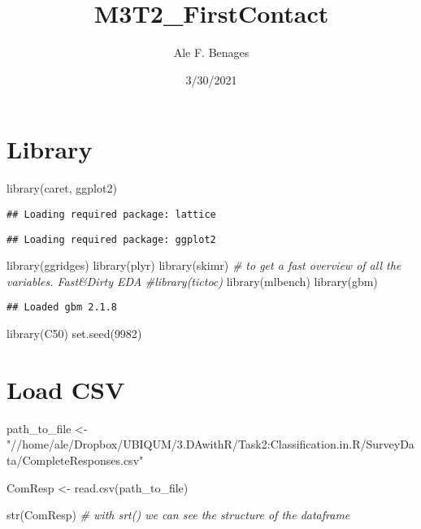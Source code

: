 \documentclass[
]{article}
\title{M3T2\_FirstContact}
\author{Ale F. Benages}
\date{3/30/2021}
\newenvironment{Shaded}{\begin{snugshade}}{\end{snugshade}}
\newcommand{\CommentTok}[1]{\textcolor[rgb]{0.56,0.35,0.01}{\textit{#1}}}
\newcommand{\DecValTok}[1]{\textcolor[rgb]{0.00,0.00,0.81}{#1}}
\newcommand{\FunctionTok}[1]{\textcolor[rgb]{0.00,0.00,0.00}{#1}}
\newcommand{\NormalTok}[1]{#1}
\newcommand{\OtherTok}[1]{\textcolor[rgb]{0.56,0.35,0.01}{#1}}
\newcommand{\StringTok}[1]{\textcolor[rgb]{0.31,0.60,0.02}{#1}}
\begin{document}
\maketitle

\hypertarget{library}{%
\section{Library}\label{library}}

\begin{Shaded}
\begin{Highlighting}[]
\FunctionTok{library}\NormalTok{(caret, ggplot2)}
\end{Highlighting}
\end{Shaded}

\begin{verbatim}
## Loading required package: lattice
\end{verbatim}

\begin{verbatim}
## Loading required package: ggplot2
\end{verbatim}

\begin{Shaded}
\begin{Highlighting}[]
\FunctionTok{library}\NormalTok{(ggridges)}
\FunctionTok{library}\NormalTok{(plyr)}
\FunctionTok{library}\NormalTok{(skimr) }\CommentTok{\# to get a fast overview of all the variables. Fast\&Dirty EDA}
\CommentTok{\#library(tictoc)}
\FunctionTok{library}\NormalTok{(mlbench)}
\FunctionTok{library}\NormalTok{(gbm)}
\end{Highlighting}
\end{Shaded}

\begin{verbatim}
## Loaded gbm 2.1.8
\end{verbatim}

\begin{Shaded}
\begin{Highlighting}[]
\FunctionTok{library}\NormalTok{(C50)}
\FunctionTok{set.seed}\NormalTok{(}\DecValTok{9982}\NormalTok{)}
\end{Highlighting}
\end{Shaded}

\hypertarget{load-csv}{%
\section{Load CSV}\label{load-csv}}

\begin{Shaded}
\begin{Highlighting}[]
\NormalTok{path\_to\_file }\OtherTok{\textless{}{-}} \StringTok{"//home/ale/Dropbox/UBIQUM/3.DAwithR/Task2:Classification.in.R/SurveyData/CompleteResponses.csv"}

\NormalTok{ComResp }\OtherTok{\textless{}{-}} \FunctionTok{read.csv}\NormalTok{(path\_to\_file)}

\FunctionTok{str}\NormalTok{(ComResp) }\CommentTok{\# with srt() we can see the structure of the dataframe}
\end{Highlighting}
\end{Shaded}
\end{document}
